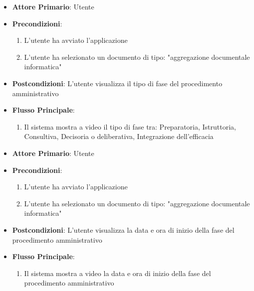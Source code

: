 \begin{itemize}
    \item \textbf{Attore Primario}: Utente
    \item \textbf{Precondizioni}:
    \begin{enumerate}
        \item L'utente ha avviato l'applicazione
        \item L'utente ha selezionato un documento di tipo: "aggregazione documentale informatica"
    \end{enumerate}
    \item \textbf{Postcondizioni}: L'utente visualizza il tipo di fase del procedimento amministrativo
    \item \textbf{Flusso Principale}: 
    \begin{enumerate}
        \item Il sistema mostra a video il tipo di fase tra: Preparatoria, Istruttoria, Consultiva, Decisoria o deliberativa, Integrazione dell'efficacia
    \end{enumerate}
\end{itemize}

\begin{itemize}
    \item \textbf{Attore Primario}: Utente
    \item \textbf{Precondizioni}:
    \begin{enumerate}
        \item L'utente ha avviato l'applicazione
        \item L'utente ha selezionato un documento di tipo: "aggregazione documentale informatica"
    \end{enumerate}
    \item \textbf{Postcondizioni}: L'utente visualizza la data e ora di inizio della fase del procedimento amministrativo
    \item \textbf{Flusso Principale}: 
    \begin{enumerate}
        \item Il sistema mostra a video la data e ora di inizio della fase del procedimento amministrativo
    \end{enumerate}
\end{itemize}

